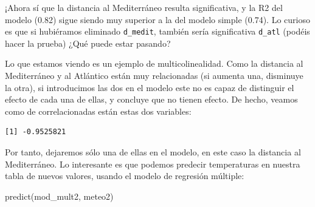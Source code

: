\documentclass[
  letterpaper,
  DIV=11,
  numbers=noendperiod]{scrreprt}
\newenvironment{Shaded}{\begin{snugshade}}{\end{snugshade}}
\newcommand{\FunctionTok}[1]{\textcolor[rgb]{0.28,0.35,0.67}{#1}}
\newcommand{\NormalTok}[1]{\textcolor[rgb]{0.00,0.23,0.31}{#1}}
\newcommand{\SpecialCharTok}[1]{\textcolor[rgb]{0.37,0.37,0.37}{#1}}
\begin{document}
¡Ahora sí que la distancia al Mediterráneo resulta significativa, y la
R2 del modelo (0.82) sigue siendo muy superior a la del modelo simple
(0.74). Lo curioso es que si hubiéramos eliminado \texttt{d\_medit},
también sería significativa \texttt{d\_atl} (podéis hacer la prueba)
¿Qué puede estar pasando?

Lo que estamos viendo es un ejemplo de multicolinealidad. Como la
distancia al Mediterráneo y al Atlántico están muy relacionadas (si
aumenta una, disminuye la otra), si introducimos las dos en el modelo
este no es capaz de distinguir el efecto de cada una de ellas, y
concluye que no tienen efecto. De hecho, veamos como de correlacionadas
están estas dos variables:

\begin{Shaded}
\end{Shaded}

\begin{verbatim}
[1] -0.9525821
\end{verbatim}

Por tanto, dejaremos sólo una de ellas en el modelo, en este caso la
distancia al Mediterráneo. Lo interesante es que podemos predecir
temperaturas en nuestra tabla de nuevos valores, usando el modelo de
regresión múltiple:

\begin{Shaded}
\begin{Highlighting}[]
\FunctionTok{predict}\NormalTok{(mod\_mult2, meteo2)}
\end{Highlighting}
\end{Shaded}
\end{document}
